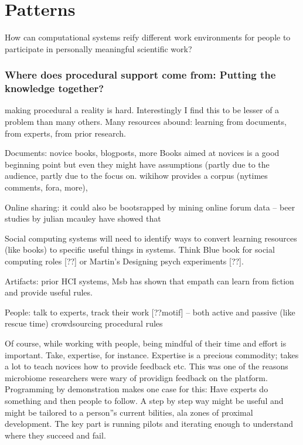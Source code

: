 




\section{Patterns} 

How can computational systems reify different work environments for people to participate in personally meaningful scientific work?


\subsubsection{Where does procedural support come from: Putting the knowledge together?}
making procedural a reality is hard. Interestingly I find this to be lesser of a problem than many others. Many resources abound: learning from documents, from experts, from prior research. 

Documents: novice books, blogposts, more
Books aimed at novices is a good beginning point but even they might have assumptions (partly due to the audience, partly due to the focus on. wikihow provides a corpus
 (nytimes comments, fora, more),  

Online sharing: it could also be bootsrapped by mining online forum data -- beer studies by julian mcauley have showed that 


Social computing systems will need to identify ways to convert learning resources (like books) to specific useful things in systems. Think Blue book for social computing roles [??] or Martin’s Designing psych experiments [??]. 

Artifacts: prior HCI systems, Msb has shown that empath can learn from fiction and provide useful rules. 

People: talk to experts, track their work [??motif] -- both active and passive (like rescue time)
crowdsourcing procedural rules

Of course, while working with people, being mindful of their time and effort is important. Take, expertise, for instance. Expertise is a precious commodity; takes a lot to teach novices how to provide feedback etc. This was one of the reasons microbiome researchers were wary of providign feedback on the platform. Programming by demonstration makes one case for this: Have experts do something and then people to follow. A step by step way might be useful and might be tailored to a person''s current bilities, ala zones of proximal development.
The key part is running pilots and iterating enough to understand where they succeed and fail. 

